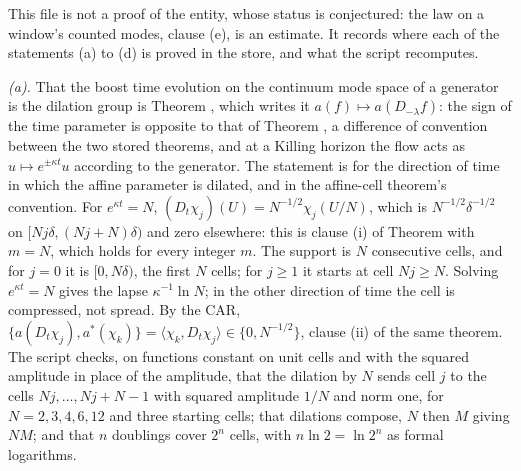 This file is not a proof of the entity, whose status is conjectured: the law on a window's counted modes, clause (e), is an estimate. It records where each of the statements (a) to (d) is proved in the store, and what the script recomputes.

\emph{(a).} That the boost time evolution on the continuum mode space of a generator is the dilation group is Theorem , which writes it $a(f) \mapsto a(D_{-\lambda}f)$: the sign of the time parameter is opposite to that of Theorem , a difference of convention between the two stored theorems, and at a Killing horizon the flow acts as $u \mapsto e^{\pm\kappa t}u$ according to the generator. The statement is for the direction of time in which the affine parameter is dilated, and in the affine-cell theorem's convention. For $e^{\kappa t} = N$, $(D_{t}\chi_{j})(U) = N^{-1/2}\chi_{j}(U/N)$, which is $N^{-1/2}\delta^{-1/2}$ on $[Nj\delta, (Nj + N)\delta)$ and zero elsewhere: this is clause (i) of Theorem  with $m = N$, which holds for every integer $m$. The support is $N$ consecutive cells, and for $j = 0$ it is $[0, N\delta)$, the first $N$ cells; for $j \ge 1$ it starts at cell $Nj \ge N$. Solving $e^{\kappa t} = N$ gives the lapse $\kappa^{-1}\ln N$; in the other direction of time the cell is compressed, not spread. By the CAR, $\{a(D_{t}\chi_{j}), a^{*}(\chi_{k})\} = \langle\chi_{k}, D_{t}\chi_{j}\rangle \in \{0, N^{-1/2}\}$, clause (ii) of the same theorem. The script checks, on functions constant on unit cells and with the squared amplitude in place of the amplitude, that the dilation by $N$ sends cell $j$ to the cells $Nj, \dots, Nj + N - 1$ with squared amplitude $1/N$ and norm one, for $N = 2, 3, 4, 6, 12$ and three starting cells; that dilations compose, $N$ then $M$ giving $NM$; and that $n$ doublings cover $2^{n}$ cells, with $n\ln 2 = \ln 2^{n}$ as formal logarithms.

